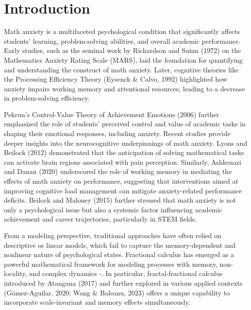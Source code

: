\documentclass[10pt]{NSP1}
\begin{document}

\maketitle

\section{Introduction}
Math anxiety is a multifaceted psychological condition that significantly affects students' learning, problem-solving abilities, and overall academic performance. Early studies, such as the seminal work by Richardson and Suinn (1972) \cite{richardson72} on the Mathematics Anxiety Rating Scale (MARS), laid the foundation for quantifying and understanding the construct of math anxiety. Later, cognitive theories like the Processing Efficiency Theory (Eysenck \& Calvo, 1992) \cite{eysenck92} highlighted how anxiety impairs working memory and attentional resources, leading to a decrease in problem-solving efficiency. 

Pekrun's Control-Value Theory of Achievement Emotions (2006) \cite{pekrun06} further emphasized the role of students' perceived control and value of academic tasks in shaping their emotional responses, including anxiety. Recent studies provide deeper insights into the neurocognitive underpinnings of math anxiety. Lyons and Beilock (2012) \cite{lyons12} demonstrated that the anticipation of solving mathematical tasks can activate brain regions associated with pain perception. Similarly, Ashkenazi and Danan (2020)     \cite{ashkenazi20} underscored the role of working memory in mediating the effects of math anxiety on performance, suggesting that interventions aimed at improving cognitive load management can mitigate anxiety-related performance deficits. Beilock and Maloney (2015)   \cite{beilock15} further stressed that math anxiety is not only a psychological issue but also a systemic factor influencing academic achievement and career trajectories, particularly in STEM fields. 

From a modeling perspective, traditional approaches have often relied on descriptive or linear models, which fail to capture the memory-dependent and nonlinear nature of psychological states. Fractional calculus has emerged as a powerful mathematical framework for modeling processes with memory, non-locality, and complex dynamics \cite{khan21}-\cite{diethelm10}. In particular, fractal-fractional calculus introduced by Atangana (2017) and further explored in various applied contexts (Gómez-Aguilar, 2020; Wang \& Baleanu, 2023) offers a unique capability to incorporate scale-invariant and memory effects simultaneously.
\end{document}
